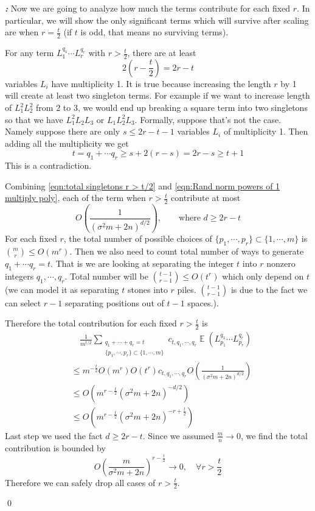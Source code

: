 \documentclass[12pt]{extarticle}
\renewenvironment{proof}[1][\proofname]{ { \it\bfseries #1: }}{\qed}
\newcommand{\1}{\field{1}}
\DeclareMathOperator{\E}{\mathbb{E}}
\DeclarePairedDelimiter\ceil{\lceil}{\rceil}
\numberwithin{equation}{section}
\begin{document}
\begin{proof}
Now we are going to analyze how much the terms contribute for each fixed $r$. In particular, we will show the only significant terms which will survive after scaling are when $r=\frac{t}{2}$ (if $t$ is odd, that means no surviving terms).

For any term $L_1^{q_1}\cdots L_r^{q_r} $ with $r> \frac{t}{2}$,  there are at least 
\begin{equation}
    2\left(r- \frac{t}{2} \right)= 2r-t \label{eqn:total singletons r > t/2}
\end{equation}
variables $L_i$ have multiplicity 1. It is true because increasing the length $r$ by 1 will create at least two singleton terms. For example if we want to increase length of $L_1^2L_2^2$ from 2 to 3, we would end up breaking a square term into two singletons so that we have $L_1^2L_2L_3$ or $L_1L_2^2L_3$. Formally, suppose that's not the case. Namely suppose there are only $s \le 2r-t -1$ variables $L_i$ of multiplicity 1. Then adding all the multiplicity we get 
\[
t=q_1+\cdots q_r \ge s+2(r-s) = 2r-s\ge t+1
\]
This is a contradiction.


Combining \cref{eqn:total singletons r > t/2} and \cref{eqn:Rand norm powers of 1 multiply poly}, each of the term when $r>\frac{t}{2}$ contribute at most 
\[
O\left(\frac{1}{\left({\sigma^2 m+2n}\right)^{d/2}}\right), 
   \qquad \text{where } d \ge 2r - t
\]
 For each fixed $r$, the total number of possible choices of $\{p_1,\cdots, p_r\}\subset \{1,\cdots,m\}$ is $\binom{m}{r} \le O(m^r)$. Then we also need to count total number of ways to generate $q_1+\cdots q_r=t$. That is we are looking at separating the integer $t$ into $r$ nonzero integers $q_1, \cdots, q_r$. Total number will be $\binom{t-1}{r-1} \le O(t^r)$ which only depend on $t$ (we can model it as separating $t$ stones into $r$ piles.  $\binom{t-1}{r-1}$ is due to the fact we can select $r-1$ separating positions out of $t-1$ spaces.).
 
 Therefore the total contribution for each fixed $r> \frac{t}{2}$ is 
 \begin{align*}
    &\quad  \frac{1}{m^{t/2}} \sum_{\substack{q_1+ \cdots +q_r = t\\ \{p_1,\cdots, p_r\}\subset \{1,\cdots,m\} }} c_{t,q_1,\cdots,q_r}\E (L_{p_1}^{q_1} \cdots L_{p_r}^{q_r}) \\
    & \le m^{-\frac{t}{2}}O(m^r) O(t^r) c_{t,q_1,\cdots,q_r} O\left(\frac{ 1 }{\left({\sigma^2 m+2n}\right)^{d/2}}\right) \\
    & \le O\left(m^{r-\frac{t}{2}} {\left({{\sigma^2m+ 2n}}\right)^{-d/2}}\right)  \\
    & \le O\left(m^{r-\frac{t}{2}}  \left({\sigma^2m+ 2n}\right)^{-r+\frac{t}{2}}\right)
\end{align*}
 Last step we used the fact $d\ge 2r-t$. Since we assumed $\frac{m}{n} \to 0$, we find the total contribution is bounded by
 \[
 O \left(\frac{m}{\sigma^2 m +2n}\right)^{r-\frac{t}{2}} \to 0, \quad \forall r > \frac{t}{2}
 \]
Therefore we can safely drop all cases of $r> \frac{t}{2}$. 
 

\end{proof}
\end{document}
